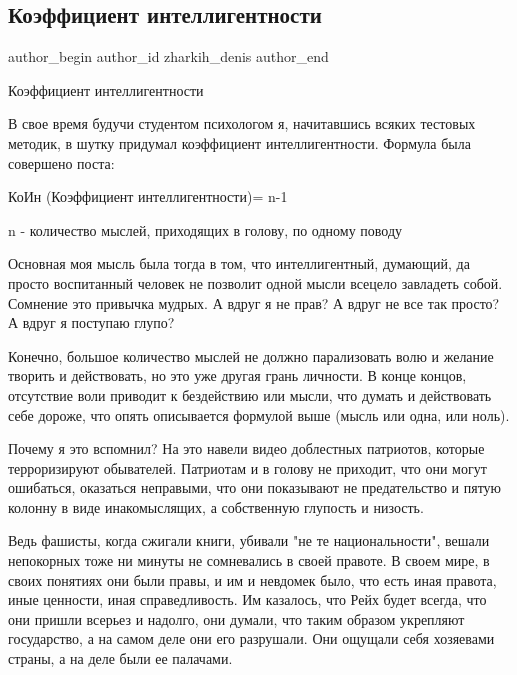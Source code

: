  
 
 
 
 
 
\subsection{Коэффициент интеллигентности}
\label{sec:14_09_2021.fb.zharkih_denis.1.koeficient_intelligentnost}
 
\ifcmt
 author_begin
   author_id zharkih_denis
 author_end
\fi

Коэффициент интеллигентности

В свое время будучи студентом психологом я, начитавшись всяких тестовых
методик, в шутку придумал коэффициент интеллигентности. Формула была совершено
поста:

КоИн (Коэффициент интеллигентности)= n-1

n - количество мыслей, приходящих в голову, по одному поводу

Основная моя мысль была тогда в том, что интеллигентный, думающий, да просто
воспитанный человек не позволит одной мысли всецело завладеть собой. Сомнение
это привычка мудрых. А вдруг я не прав? А вдруг не все так просто? А вдруг я
поступаю глупо? 

Конечно, большое количество мыслей не должно парализовать волю и желание
творить и действовать, но это уже другая грань личности. В конце концов,
отсутствие воли приводит к бездействию или мысли, что думать и действовать себе
дороже, что опять описывается формулой выше (мысль или одна, или ноль). 

Почему я это вспомнил? На это навели видео доблестных патриотов, которые
терроризируют обывателей. Патриотам и в голову не приходит, что они могут
ошибаться, оказаться неправыми, что они показывают не предательство и пятую
колонну в виде инакомыслящих, а собственную глупость и низость. 

Ведь фашисты, когда сжигали книги, убивали "не те национальности", вешали
непокорных тоже ни минуты не сомневались в своей правоте. В своем мире, в своих
понятиях они были правы, и им и невдомек было, что есть иная правота, иные
ценности, иная справедливость. Им казалось, что Рейх будет всегда, что они
пришли всерьез и надолго, они думали, что таким образом укрепляют государство,
а на самом деле они его разрушали. Они ощущали себя хозяевами страны, а на деле
были ее палачами.  

